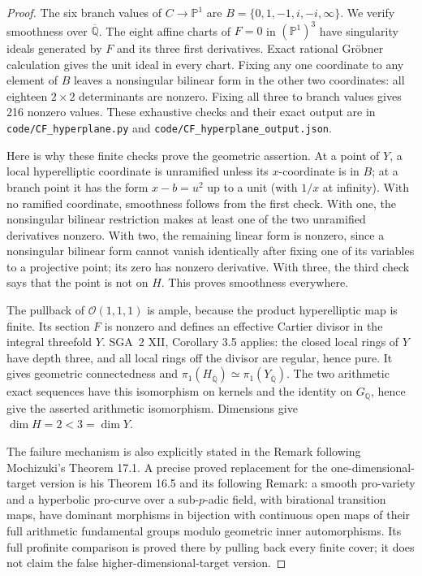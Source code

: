\begin{proof}
The six branch values of $C\to\mathbb P^1$ are
$B=\{0,1,-1,i,-i,\infty\}$. We verify smoothness over
$\overline{\mathbb Q}$. The eight affine charts of $F=0$ in
$(\mathbb P^1)^3$ have singularity ideals generated by $F$ and its
three first derivatives. Exact rational Gr\"obner calculation gives
the unit ideal in every chart. Fixing any one coordinate to any
element of $B$ leaves a nonsingular bilinear form in the other two
coordinates: all eighteen $2\times2$ determinants are nonzero.
Fixing all three to branch values gives 216 nonzero values.
These exhaustive checks and their exact output are in
\texttt{code/CF\_hyperplane.py} and
\texttt{code/CF\_hyperplane\_output.json}.

Here is why these finite checks prove the geometric assertion.
At a point of $Y$, a local hyperelliptic coordinate is unramified
unless its $x$-coordinate is in $B$; at a branch point it has the
form $x-b=u^2$ up to a unit (with $1/x$ at infinity).
With no ramified coordinate, smoothness follows from the first
check. With one, the nonsingular bilinear restriction makes at
least one of the two unramified derivatives nonzero. With two,
the remaining linear form is nonzero, since a nonsingular
bilinear form cannot vanish identically after fixing one of its
variables to a projective point; its zero has nonzero derivative.
With three, the third check says that the point is not on $H$.
This proves smoothness everywhere.

The pullback of $\mathcal O(1,1,1)$ is ample, because the product
hyperelliptic map is finite. Its section $F$ is nonzero and defines
an effective Cartier divisor in the integral threefold $Y$.
SGA~2 XII, Corollary 3.5 \cite{CF_SGA2} applies: the closed local
rings of $Y$ have depth three, and all local rings off the divisor
are regular, hence pure. It gives geometric connectedness and
$\pi_1(H_{\overline{\mathbb Q}})\simeq
\pi_1(Y_{\overline{\mathbb Q}})$. The two arithmetic exact
sequences have this isomorphism on kernels and the identity on
$G_{\mathbb Q}$, hence give the asserted arithmetic isomorphism.
Dimensions give $\dim H=2<3=\dim Y$.

The failure mechanism is also explicitly stated in the Remark
following Mochizuki's Theorem 17.1. A precise proved replacement
for the one-dimensional-target version is his Theorem 16.5 and
its following Remark: a smooth pro-variety and a hyperbolic
pro-curve over a sub-$p$-adic field, with birational transition
maps, have dominant morphisms in bijection with continuous open
maps of their full arithmetic fundamental groups modulo geometric
inner automorphisms. Its full profinite comparison is proved there
by pulling back every finite cover; it does not claim the false
higher-dimensional-target version.
\end{proof}
